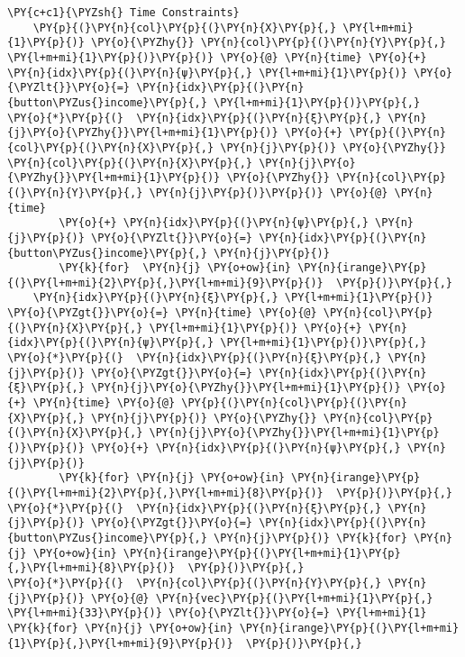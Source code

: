 \begin{tcolorbox}[breakable, size=fbox, boxrule=1pt, pad at break*=1mm,colback=cellbackground, colframe=cellborder]
\begin{Verbatim}[commandchars=\\\{\}]
    \PY{c+c1}{\PYZsh{} Time Constraints}
    \PY{p}{(}\PY{n}{col}\PY{p}{(}\PY{n}{X}\PY{p}{,} \PY{l+m+mi}{1}\PY{p}{)} \PY{o}{\PYZhy{}} \PY{n}{col}\PY{p}{(}\PY{n}{Y}\PY{p}{,} \PY{l+m+mi}{1}\PY{p}{)}\PY{p}{)} \PY{o}{@} \PY{n}{time} \PY{o}{+} \PY{n}{idx}\PY{p}{(}\PY{n}{ψ}\PY{p}{,} \PY{l+m+mi}{1}\PY{p}{)} \PY{o}{\PYZlt{}}\PY{o}{=} \PY{n}{idx}\PY{p}{(}\PY{n}{button\PYZus{}income}\PY{p}{,} \PY{l+m+mi}{1}\PY{p}{)}\PY{p}{,}
\PY{o}{*}\PY{p}{(}  \PY{n}{idx}\PY{p}{(}\PY{n}{ξ}\PY{p}{,} \PY{n}{j}\PY{o}{\PYZhy{}}\PY{l+m+mi}{1}\PY{p}{)} \PY{o}{+} \PY{p}{(}\PY{n}{col}\PY{p}{(}\PY{n}{X}\PY{p}{,} \PY{n}{j}\PY{p}{)} \PY{o}{\PYZhy{}} \PY{n}{col}\PY{p}{(}\PY{n}{X}\PY{p}{,} \PY{n}{j}\PY{o}{\PYZhy{}}\PY{l+m+mi}{1}\PY{p}{)} \PY{o}{\PYZhy{}} \PY{n}{col}\PY{p}{(}\PY{n}{Y}\PY{p}{,} \PY{n}{j}\PY{p}{)}\PY{p}{)} \PY{o}{@} \PY{n}{time}
        \PY{o}{+} \PY{n}{idx}\PY{p}{(}\PY{n}{ψ}\PY{p}{,} \PY{n}{j}\PY{p}{)} \PY{o}{\PYZlt{}}\PY{o}{=} \PY{n}{idx}\PY{p}{(}\PY{n}{button\PYZus{}income}\PY{p}{,} \PY{n}{j}\PY{p}{)}
        \PY{k}{for}  \PY{n}{j} \PY{o+ow}{in} \PY{n}{irange}\PY{p}{(}\PY{l+m+mi}{2}\PY{p}{,}\PY{l+m+mi}{9}\PY{p}{)}  \PY{p}{)}\PY{p}{,}
    \PY{n}{idx}\PY{p}{(}\PY{n}{ξ}\PY{p}{,} \PY{l+m+mi}{1}\PY{p}{)} \PY{o}{\PYZgt{}}\PY{o}{=} \PY{n}{time} \PY{o}{@} \PY{n}{col}\PY{p}{(}\PY{n}{X}\PY{p}{,} \PY{l+m+mi}{1}\PY{p}{)} \PY{o}{+} \PY{n}{idx}\PY{p}{(}\PY{n}{ψ}\PY{p}{,} \PY{l+m+mi}{1}\PY{p}{)}\PY{p}{,}
\PY{o}{*}\PY{p}{(}  \PY{n}{idx}\PY{p}{(}\PY{n}{ξ}\PY{p}{,} \PY{n}{j}\PY{p}{)} \PY{o}{\PYZgt{}}\PY{o}{=} \PY{n}{idx}\PY{p}{(}\PY{n}{ξ}\PY{p}{,} \PY{n}{j}\PY{o}{\PYZhy{}}\PY{l+m+mi}{1}\PY{p}{)} \PY{o}{+} \PY{n}{time} \PY{o}{@} \PY{p}{(}\PY{n}{col}\PY{p}{(}\PY{n}{X}\PY{p}{,} \PY{n}{j}\PY{p}{)} \PY{o}{\PYZhy{}} \PY{n}{col}\PY{p}{(}\PY{n}{X}\PY{p}{,} \PY{n}{j}\PY{o}{\PYZhy{}}\PY{l+m+mi}{1}\PY{p}{)}\PY{p}{)} \PY{o}{+} \PY{n}{idx}\PY{p}{(}\PY{n}{ψ}\PY{p}{,} \PY{n}{j}\PY{p}{)}
        \PY{k}{for} \PY{n}{j} \PY{o+ow}{in} \PY{n}{irange}\PY{p}{(}\PY{l+m+mi}{2}\PY{p}{,}\PY{l+m+mi}{8}\PY{p}{)}  \PY{p}{)}\PY{p}{,}
\PY{o}{*}\PY{p}{(}  \PY{n}{idx}\PY{p}{(}\PY{n}{ξ}\PY{p}{,} \PY{n}{j}\PY{p}{)} \PY{o}{\PYZgt{}}\PY{o}{=} \PY{n}{idx}\PY{p}{(}\PY{n}{button\PYZus{}income}\PY{p}{,} \PY{n}{j}\PY{p}{)} \PY{k}{for} \PY{n}{j} \PY{o+ow}{in} \PY{n}{irange}\PY{p}{(}\PY{l+m+mi}{1}\PY{p}{,}\PY{l+m+mi}{8}\PY{p}{)}  \PY{p}{)}\PY{p}{,}
\PY{o}{*}\PY{p}{(}  \PY{n}{col}\PY{p}{(}\PY{n}{Y}\PY{p}{,} \PY{n}{j}\PY{p}{)} \PY{o}{@} \PY{n}{vec}\PY{p}{(}\PY{l+m+mi}{1}\PY{p}{,} \PY{l+m+mi}{33}\PY{p}{)} \PY{o}{\PYZlt{}}\PY{o}{=} \PY{l+m+mi}{1} \PY{k}{for} \PY{n}{j} \PY{o+ow}{in} \PY{n}{irange}\PY{p}{(}\PY{l+m+mi}{1}\PY{p}{,}\PY{l+m+mi}{9}\PY{p}{)}  \PY{p}{)}\PY{p}{,}

\end{Verbatim}
\end{tcolorbox}
